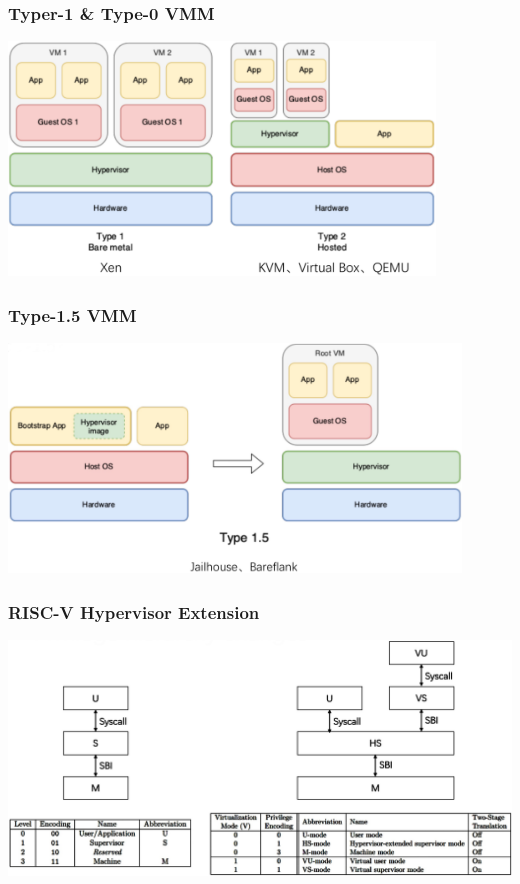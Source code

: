 % 
% 
\begin{frame}
    \frametitle{Typer-1 \& Type-0 VMM}
            \centering
            \includegraphics[width=0.85\textwidth]{figs/type-1-2-VMM.png}

\end{frame}
% 
\begin{frame}
    \frametitle{Type-1.5 VMM}

            \centering
            \includegraphics[width=0.9\textwidth]{figs/type-1.5-VMM.png}

\end{frame}
\begin{frame}
    \frametitle{RISC-V Hypervisor Extension}

            \centering
            \includegraphics[width=1.0\textwidth]{figs/RV-Virtualization.png}

\end{frame}
